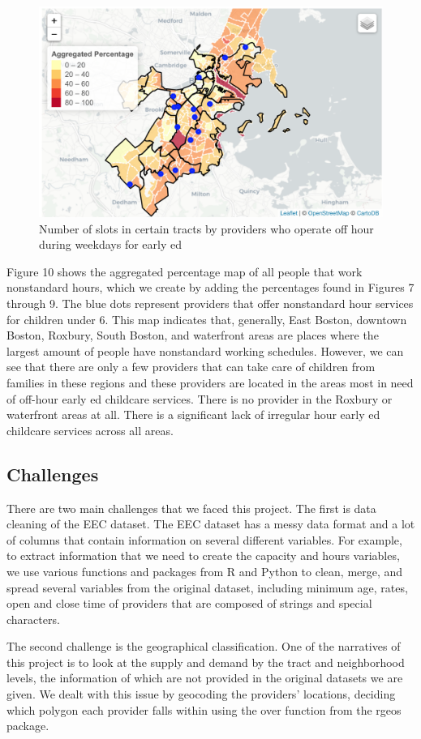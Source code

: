 \documentclass[10pt,letterpaper]{article}
\begin{document}
\begin{figure}

{\centering \includegraphics[width=0.25\linewidth]{aggregatehourdemand} 

}

\caption{Number of slots in certain tracts by providers who operate off hour during weekdays for early ed}\label{fig:unnamed-chunk-10}
\end{figure}

Figure 10 shows the aggregated percentage map of all people that work
nonstandard hours, which we create by adding the percentages found in
Figures 7 through 9. The blue dots represent providers that offer
nonstandard hour services for children under 6. This map indicates that,
generally, East Boston, downtown Boston, Roxbury, South Boston, and
waterfront areas are places where the largest amount of people have
nonstandard working schedules. However, we can see that there are only a
few providers that can take care of children from families in these
regions and these providers are located in the areas most in need of
off-hour early ed childcare services. There is no provider in the
Roxbury or waterfront areas at all. There is a significant lack of
irregular hour early ed childcare services across all areas.

\subsection{Challenges}\label{challenges}

There are two main challenges that we faced this project. The first is
data cleaning of the EEC dataset. The EEC dataset has a messy data
format and a lot of columns that contain information on several
different variables. For example, to extract information that we need to
create the capacity and hours variables, we use various functions and
packages from R and Python to clean, merge, and spread several variables
from the original dataset, including minimum age, rates, open and close
time of providers that are composed of strings and special characters.

The second challenge is the geographical classification. One of the
narratives of this project is to look at the supply and demand by the
tract and neighborhood levels, the information of which are not provided
in the original datasets we are given. We dealt with this issue by
geocoding the providers' locations, deciding which polygon each provider
falls within using the over function from the rgeos package.
\end{document}
